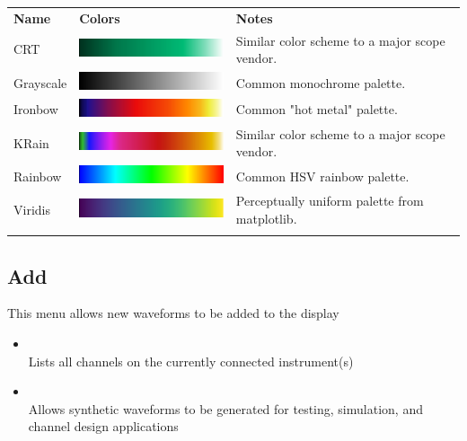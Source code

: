 \begin{tabularx}{16cm}{llX}
\thickhline
\textbf{Name} & \textbf{Colors} & \textbf{Notes} \\
\thickhline
CRT & \includegraphics[width=5cm]{images/eye-gradient-crt.png} & Similar color scheme to a major scope vendor.\\
Grayscale & \includegraphics[width=5cm]{images/eye-gradient-grayscale.png} & Common monochrome palette.\\
Ironbow & \includegraphics[width=5cm]{images/eye-gradient-ironbow.png} & Common "hot metal" palette. \\
KRain & \includegraphics[width=5cm]{images/eye-gradient-krain.png} & Similar color scheme to a major scope vendor.\\
Rainbow & \includegraphics[width=5cm]{images/eye-gradient-rainbow.png} & Common HSV rainbow palette. \\
Viridis & \includegraphics[width=5cm]{images/eye-gradient-viridis.png} & Perceptually uniform palette from matplotlib. \\
\thickhline
\end{tabularx}

\subsection{Add}

This menu allows new waveforms to be added to the display

\begin{itemize}

\item {}\\
Lists all channels on the currently connected instrument(s)

\item {}\\
Allows synthetic waveforms to be generated for testing, simulation, and channel design applications

\end{itemize}

